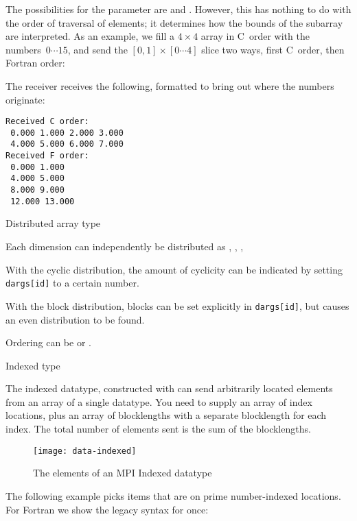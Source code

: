 The possibilities for the  parameter are
 and .
However, this has nothing to do with the order of traversal of elements;
it determines how the bounds of the subarray are interpreted.
As an example, we fill a $4\times 4$ array in C~order with the numbers~$0\cdots15$,
and send the $[0,1]\times [0\cdots4]$ slice two ways, 
first C~order, then Fortran order:
%

The receiver receives the following, formatted to bring out
where the numbers originate:
\begin{verbatim}
Received C order:
 0.000 1.000 2.000 3.000
 4.000 5.000 6.000 7.000
Received F order:
 0.000 1.000
 4.000 5.000
 8.000 9.000
 12.000 13.000
\end{verbatim}

 {Distributed array type}

Each dimension can independently be distributed as
,
,
,

With the cyclic distribution, the amount of cyclicity
can be indicated by setting \lstinline{dargs[id]} to a certain number.

With the block distribution,
blocks can be set explicitly in \lstinline{dargs[id]},
but  causes an even distribution
to be found.

Ordering can be  or .

 {Indexed type}
\label{sec:data:indexed}

The indexed datatype, constructed with 
can send arbitrarily located elements from an array of a single datatype.
You need to supply an array of index locations, plus an array of blocklengths
with a separate blocklength for each index. The total number of elements sent
is the sum of the blocklengths.

\begin{figure}[t]
  \texttt{[image: data-indexed]}
  \caption{The elements of an MPI Indexed datatype}
  \label{fig:data-indexed}
\end{figure}

The following example picks items that are on prime number-indexed
locations.
%
For Fortran we show the legacy syntax for once:
%
%

